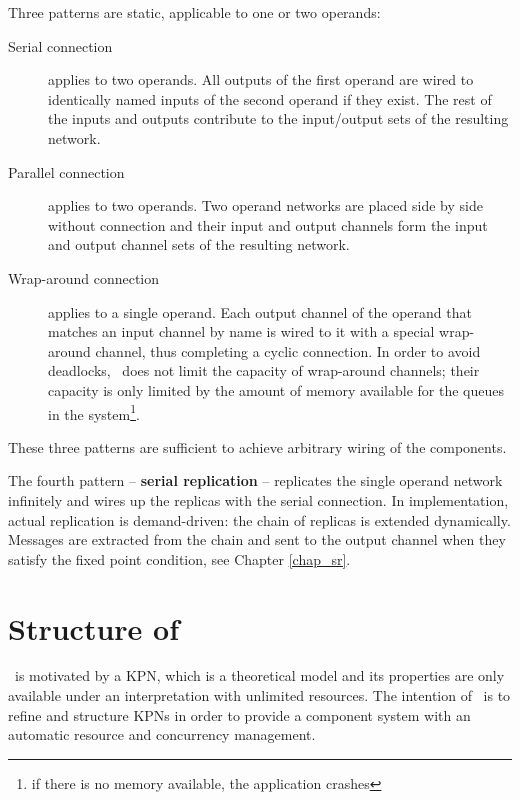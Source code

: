 Three patterns are static, applicable to one or two operands:
\begin{description}
\item[Serial connection] applies to two operands. All outputs of the first operand are wired to identically named inputs of the second operand if they exist. The rest of the inputs and outputs contribute to the input/output sets of the resulting network.

\item[Parallel connection] applies to two operands. Two operand networks are placed side by side without connection and their input and output channels form the input and output channel sets of the resulting network.

\item[Wrap-around connection] applies to a single operand. Each output channel of the operand that matches an input channel by name is wired to it with a special wrap-around channel, thus completing a cyclic connection. In order to avoid deadlocks, \ak\ does not limit the capacity of wrap-around channels; their capacity is only limited by the amount of memory available for the queues in the system\footnote{if there is no memory available, the application crashes}.
\end{description}
These three patterns are sufficient to achieve arbitrary wiring of the components. %

The fourth pattern -- \textbf{serial replication} -- replicates the single operand network infinitely and wires up the replicas with the serial connection. In implementation, actual replication is demand-driven: the chain of replicas is extended dynamically. Messages are extracted from the chain and sent to the output channel when they satisfy the fixed point condition, see Chapter \ref{chap_sr}.



\section{Structure of \ak\ }
\ak\ is motivated by a KPN, which is a theoretical model and its properties are only available under an interpretation with unlimited resources. The intention of \ak\ is to refine and structure KPNs in order to provide a component system with an automatic resource and concurrency management.

